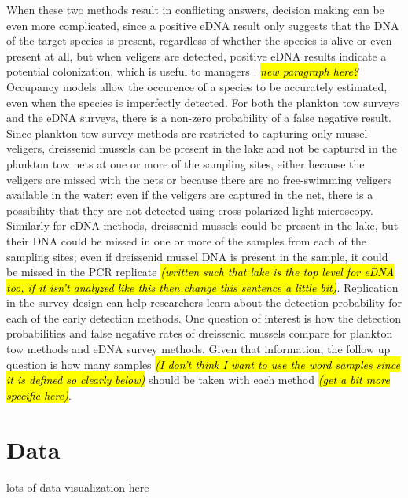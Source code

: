 \documentclass[12pt]{article}\usepackage[]{graphicx}\usepackage[]{color}
\begin{document}
When these two methods result in conflicting answers, decision making can be even more complicated, since a positive eDNA result only suggests that the DNA of the target species is present, regardless of whether the species is alive or even present at all, but when veligers are detected, positive eDNA results indicate a potential colonization, which is useful to managers \cite{Holser:body}. \textit{\hl{new paragraph here?}}Occupancy models allow the occurence of a species to be accurately estimated, even when the species is imperfectly detected. For both the plankton tow surveys and the eDNA surveys, there is a non-zero probability of a false negative result. Since plankton tow survey methods are restricted to capturing only mussel veligers, dreissenid mussels can be present in the lake and not be captured in the plankton tow nets at one or more of the sampling sites, either because the veligers are missed with the nets or because there are no free-swimming veligers available in the water; even if the veligers are captured in the net, there is a possibility that they are not detected using cross-polarized light microscopy. Similarly for eDNA methods, dreissenid mussels could be present in the lake, but their DNA could be missed in one or more of the samples from each of the sampling sites; even if dreissenid mussel DNA is present in the sample, it could be missed in the PCR replicate \textit{\hl{(written such that lake is the top level for eDNA too, if it isn't analyzed like this  then change this sentence a little bit)}}. Replication in the survey design can help researchers learn about the detection probability for each of the early detection methods. One question of interest is how the detection probabilities and false negative rates of dreissenid mussels compare for plankton tow methods and eDNA survey methods. Given that information, the follow up question is how many samples \textit{\hl{(I don't think I want to use the word samples since it is defined so clearly below)}} should be taken with each method \textit{\hl{(get a bit more specific here)}}. 

\section{Data}

lots of data visualization here
\end{document}
